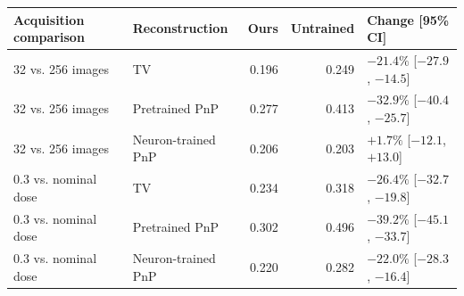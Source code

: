 \begin{tabular}{llrrl}
\toprule
Acquisition comparison & Reconstruction & Ours & Untrained & Change [95\% CI] \\
\midrule
32 vs. 256 images & TV & 0.196 & 0.249 & $-21.4\%$ [$-27.9$, $-14.5$] \\
32 vs. 256 images & Pretrained PnP & 0.277 & 0.413 & $-32.9\%$ [$-40.4$, $-25.7$] \\
32 vs. 256 images & Neuron-trained PnP & 0.206 & 0.203 & $+1.7\%$ [$-12.1$, $+13.0$] \\
0.3 vs. nominal dose & TV & 0.234 & 0.318 & $-26.4\%$ [$-32.7$, $-19.8$] \\
0.3 vs. nominal dose & Pretrained PnP & 0.302 & 0.496 & $-39.2\%$ [$-45.1$, $-33.7$] \\
0.3 vs. nominal dose & Neuron-trained PnP & 0.220 & 0.282 & $-22.0\%$ [$-28.3$, $-16.4$] \\
\bottomrule
\end{tabular}
